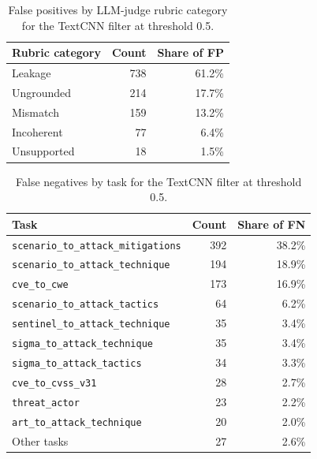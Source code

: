 \begin{table}[t]
\centering
\caption{False positives by LLM-judge rubric category for the TextCNN filter at threshold 0.5.}
\label{tab:textcnn-fp-breakdown}
\begin{tabular}{lrr}
\toprule
Rubric category & Count & Share of FP \\
\midrule
Leakage & 738 & 61.2\% \\
Ungrounded & 214 & 17.7\% \\
Mismatch & 159 & 13.2\% \\
Incoherent & 77 & 6.4\% \\
Unsupported & 18 & 1.5\% \\
\bottomrule
\end{tabular}
\end{table}

\begin{table}[t]
\centering
\caption{False negatives by task for the TextCNN filter at threshold 0.5.}
\label{tab:textcnn-fn-breakdown}
\small
\begin{tabular}{lrr}
\toprule
Task & Count & Share of FN \\
\midrule
\texttt{scenario\_to\_attack\_mitigations} & 392 & 38.2\% \\
\texttt{scenario\_to\_attack\_technique} & 194 & 18.9\% \\
\texttt{cve\_to\_cwe} & 173 & 16.9\% \\
\texttt{scenario\_to\_attack\_tactics} & 64 & 6.2\% \\
\texttt{sentinel\_to\_attack\_technique} & 35 & 3.4\% \\
\texttt{sigma\_to\_attack\_technique} & 35 & 3.4\% \\
\texttt{sigma\_to\_attack\_tactics} & 34 & 3.3\% \\
\texttt{cve\_to\_cvss\_v31} & 28 & 2.7\% \\
\texttt{threat\_actor} & 23 & 2.2\% \\
\texttt{art\_to\_attack\_technique} & 20 & 2.0\% \\
Other tasks & 27 & 2.6\% \\
\bottomrule
\end{tabular}
\end{table}
